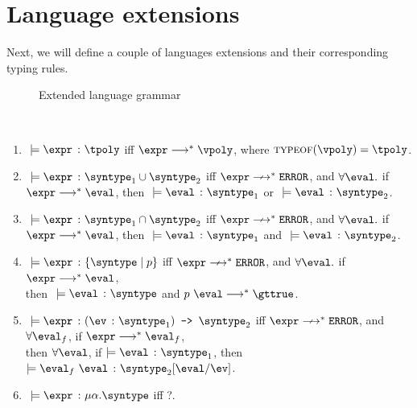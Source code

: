 \section{Language extensions}

Next, we will define a couple of languages extensions and their corresponding typing rules.

\begin{figure}[hbt!]%
  \begin{grammar}
            \grule[expressions]{\expr}{
              \cdots
              \gor \vpoly
            }
            \grule[values]{\eval}{
              \cdots
              \gor \vpoly
            }
            \grule[types]{\syntype}{
              \cdots
              \gor \tpoly
              \gor \mkunion{\syntype}{\syntype}
              \gor \mkintersect{\syntype}{\syntype}
              \gor \mktset{\syntype}{\expr}
              \gor \mkdfun{\ev}{\syntype}{\syntype}
              \gor \mkmiu{\alpha}{\syntype}
          }
        \end{grammar}
    \caption{Extended language grammar}
    \label{ext_Grammar}
\end{figure}

\begin{definition}
  \label{def_typingRulesExt}
  \ \par
  \begin{enumerate}
      \item $\ \models \hastype{\expr}{\tpoly}$ iff $\expr \smallsteps[] \vpoly$, where $\textsc{typeof}(\vpoly) = \tpoly$.
      \item $\ \models \hastype{\expr}{\mkunion{\syntype_1}{\syntype_2}}$ iff $\expr \nsmallsteps[] \eerror$, and $\forall \eval.$ if $\expr \smallsteps[] \eval$, then $\ \models \hastype{\eval}{\syntype_1}$ or $\ \models \hastype{\eval}{\syntype_2}$.
      \item $\ \models \hastype{\expr}{\mkintersect{\syntype_1}{\syntype_2}}$ iff $\expr \nsmallsteps[] \eerror$, and $\forall \eval.$ if $\expr \smallsteps[] \eval$, then $\ \models \hastype{\eval}{\syntype_1}$ and $\ \models \hastype{\eval}{\syntype_2}$.
      \item $\ \models \hastype{\expr}{\mktset{\syntype}{p}}$ iff $\expr \nsmallsteps[] \eerror$, and $\forall \eval.$ if $\expr \smallsteps[] \eval$, \\ then $\ \models \hastype{\eval}{\syntype}$ and $p \ \eval \smallsteps[] \gttrue$.
      \item $\ \models \hastype{\expr}{\mkdfun{\ev}{\syntype_1}{\syntype_2}}$ iff $\expr \nsmallsteps[] \eerror$, and $\forall{\eval_f}$, if $\expr \smallsteps[] \eval_f$, \\ then $\forall \eval$, if $\models \hastype{\eval}{\syntype_1}$, then $\models \hastype{\eval_f\ \eval}{\substitute{\syntype_2}{\eval}{\ev}}$.
      \item $\ \models \hastype{\expr}{\mkmiu{\alpha}{\syntype}}$ iff ?.
  \end{enumerate}
\end{definition}

